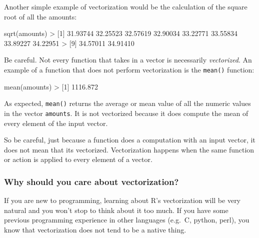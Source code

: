 \documentclass[
]{book}
\newenvironment{Shaded}{\begin{snugshade}}{\end{snugshade}}
\newcommand{\DecValTok}[1]{\textcolor[rgb]{0.00,0.00,0.81}{#1}}
\newcommand{\FloatTok}[1]{\textcolor[rgb]{0.00,0.00,0.81}{#1}}
\newcommand{\FunctionTok}[1]{\textcolor[rgb]{0.00,0.00,0.00}{#1}}
\newcommand{\NormalTok}[1]{#1}
\newcommand{\SpecialCharTok}[1]{\textcolor[rgb]{0.00,0.00,0.00}{#1}}
\begin{document}
Another simple example of vectorization would be the calculation of the square
root of all the amounts:

\begin{Shaded}
\begin{Highlighting}[]
\FunctionTok{sqrt}\NormalTok{(amounts)}
\SpecialCharTok{\textgreater{}}\NormalTok{  [}\DecValTok{1}\NormalTok{] }\FloatTok{31.93744} \FloatTok{32.25523} \FloatTok{32.57619} \FloatTok{32.90034} \FloatTok{33.22771} \FloatTok{33.55834} \FloatTok{33.89227} \FloatTok{34.22951}
\SpecialCharTok{\textgreater{}}\NormalTok{  [}\DecValTok{9}\NormalTok{] }\FloatTok{34.57011} \FloatTok{34.91410}
\end{Highlighting}
\end{Shaded}

Be careful. Not every function that takes in a vector is necessarily \emph{vectorized}.
An example of a function that does not perform vectorization is the \texttt{mean()}
function:

\begin{Shaded}
\begin{Highlighting}[]
\FunctionTok{mean}\NormalTok{(amounts)}
\SpecialCharTok{\textgreater{}}\NormalTok{ [}\DecValTok{1}\NormalTok{] }\FloatTok{1116.872}
\end{Highlighting}
\end{Shaded}

As expected, \texttt{mean()} returns the average or mean value of all the numeric
values in the vector \texttt{amounts}. It is not vectorized because it does compute
the mean of every element of the input vector.

So be careful, just because a function does a computation with an input vector,
it does not mean that its vectorized. Vectorization happens when the same
function or action is applied to every element of a vector.

\hypertarget{why-should-you-care-about-vectorization}{%
\subsubsection*{Why should you care about vectorization?}\label{why-should-you-care-about-vectorization}}

If you are new to programming, learning about R's vectorization will be very
natural and you won't stop to think about it too much. If you have some previous
programming experience in other languages (e.g.~C, python, perl), you know
that vectorization does not tend to be a native thing.
\end{document}

